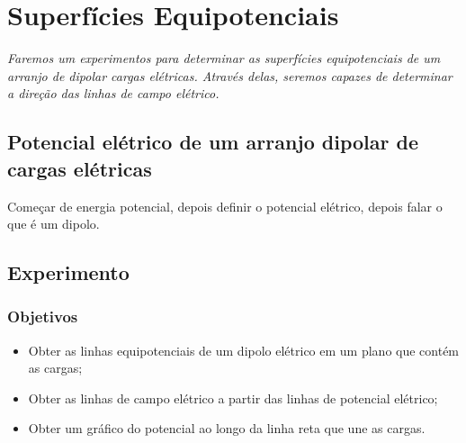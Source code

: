 \chapter{Superfícies Equipotenciais} %
\label{Chap:SupEquip}        %

\begin{fullwidth}\it
	Faremos um experimentos para determinar as superfícies equipotenciais de um arranjo de dipolar cargas elétricas. Através delas, seremos capazes de determinar a direção das linhas de campo elétrico.
\end{fullwidth}

\section{Potencial elétrico de um arranjo dipolar de cargas elétricas}

Começar de energia potencial, depois definir o potencial elétrico, depois falar o que é um dipolo.


\section{Experimento}

\subsection{Objetivos}

\begin{itemize}
	\item Obter as linhas equipotenciais de um dipolo elétrico em um plano que contém as cargas;
	\item Obter as linhas de campo elétrico a partir das linhas de potencial elétrico;
	\item Obter um gráfico do potencial ao longo da linha reta que une as cargas.
\end{itemize}

